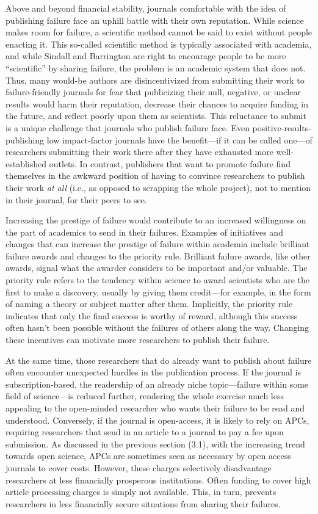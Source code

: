 \documentclass[editorial, authordate,twocolumn,issue]{jote-new-article}
\begin{document}
Above and beyond financial stability, journals comfortable with the idea of publishing failure face an uphill battle with their own reputation. While science makes room for failure, a scientific method cannot be said to exist without people enacting it. This so-called scientific method is typically associated with academia, and while Sindall and Barrington are right to encourage people to be more “scientific” by sharing failure, the problem is an academic system that does not. Thus, many would-be authors are disincentivized from submitting their work to failure-friendly journals for fear that publicizing their null, negative, or unclear results would harm their reputation, decrease their chances to acquire funding in the future, and reflect poorly upon them as scientists. This reluctance to submit is a unique challenge that journals who publish failure face. Even positive-results-publishing low impact-factor journals have the benefit—if it can be called one—of researchers submitting their work there after they have exhausted more well-established outlets. In contrast, publishers that want to promote failure find themselves in the awkward position of having to convince researchers to publish their work \emph{at all} (i.e., as opposed to scrapping the whole project), not to mention in their journal, for their peers to see. 

Increasing the prestige of failure would contribute to an increased willingness on the part of academics to send in their failures. Examples of initiatives and changes that can increase the prestige of failure within academia include brilliant failure awards and changes to the priority rule. Brilliant failure awards, like other awards, signal what the awarder considers to be important and/or valuable. The priority rule refers to the tendency within science to award scientists who are the first to make a discovery, usually by giving them credit—for example, in the form of naming a theory or subject matter after them. Implicitly, the priority rule indicates that only the final success is worthy of reward, although this success often hasn't been possible without the failures of others along the way. Changing these incentives can motivate more researchers to publish their failure. 

At the same time, those researchers that do already want to publish about failure often encounter unexpected hurdles in the publication process. If the journal is subscription-based, the readership of an already niche topic—failure within some field of science—is reduced further, rendering the whole exercise much less appealing to the open-minded researcher who wants their failure to be read and understood. Conversely, if the journal is open-access, it is likely to rely on APCs, requiring researchers that send in an article to a journal to pay a fee upon submission. As discussed in the previous section (3.1), with the increasing trend towards open science, APCs are sometimes seen as necessary by open access journals to cover costs. However, these charges selectively disadvantage researchers at less financially prosperous institutions. Often funding to cover high article processing charges is simply not available. This, in turn, prevents researchers in less financially secure situations from sharing their failures.
\end{document}
